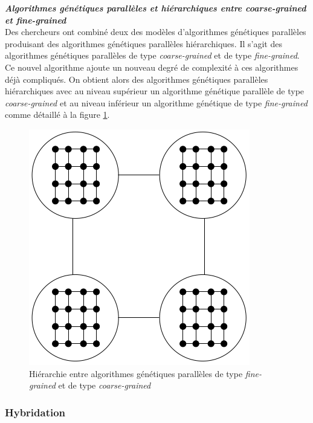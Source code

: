 	\textsl{\textbf{Algorithmes génétiques parallèles et hiérarchiques entre \emph{coarse-grained} et \emph{fine-grained}}}\\
	
	Des chercheurs \cite{cant2} ont combiné deux des modèles d'algorithmes génétiques parallèles produisant des algorithmes génétiques parallèles hiérarchiques. Il s'agit des algorithmes génétiques parallèles de type \emph{coarse-grained} et de type \emph{fine-grained}. Ce nouvel algorithme ajoute un nouveau degré de complexité à ces algorithmes déjà compliqués. On obtient alors des algorithmes génétiques parallèles hiérarchiques avec au niveau supérieur un algorithme génétique parallèle de type \emph{coarse-grained} et au niveau inférieur un algorithme génétique de type \emph{fine-grained} comme détaillé à la figure \ref{fig:hierar_fine_grained_fig}.
	
	\begin{figure}[!h]
		\begin{center}
			\includegraphics[scale=.3]{images/hierar_fine_grained_fig.png}
			\caption{Hiérarchie entre algorithmes génétiques parallèles de type \emph{fine-grained} et de type \emph{coarse-grained} \cite{cant2}}
			\label{fig:hierar_fine_grained_fig}
		\end{center}
	\end{figure} 
	
	\subsubsection{Hybridation}
	
